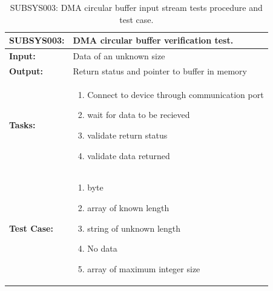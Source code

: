 \begin{table}[H]
    \centering
    \caption{SUBSYS003: DMA circular buffer input stream tests procedure and test case.}
    \begin{tabular}{|m{}|m{}|}
    \hline
       \textbf{SUBSYS003: }  &  DMA circular buffer verification test.\\
       \hline
        \textbf{Input: } &  Data of an unknown size\\
        \hline
        \textbf{Output: } & Return status and pointer to buffer in memory\\
        \hline
        \textbf{Tasks: } & \begin{enumerate}
        \vspace{1mm}
            \item Connect to device through communication port
            \item wait for data to be recieved
            \item validate return status
            \item validate data returned
            
        \end{enumerate}\\
        \hline
        \textbf{Test Case: } & \begin{enumerate}
            \vspace{1mm}
            \item byte
            \item array of known length
            \item string of unknown length
            \item No data 
            \item array of maximum integer size
        \end{enumerate}\\
        \hline
    \end{tabular}

    \label{tab:SUBSYS003}
\end{table}

